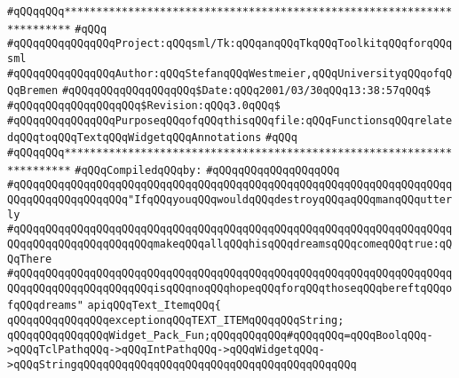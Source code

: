 \label{src/lib/tk/src/text_item.api}
\verb|#qQQqqQQq***********************************************************************|\newline
\verb|#qQQq|\newline
\verb|#qQQqqQQqqQQqqQQqProject:qQQqsml/Tk:qQQqanqQQqTkqQQqToolkitqQQqforqQQqsml|\newline
\verb|#qQQqqQQqqQQqqQQqAuthor:qQQqStefanqQQqWestmeier,qQQqUniversityqQQqofqQQqBremen|\newline
\verb|#qQQqqQQqqQQqqQQqqQQq$Date:qQQq2001/03/30qQQq13:38:57qQQq$|\newline
\verb|#qQQqqQQqqQQqqQQqqQQq$Revision:qQQq3.0qQQq$|\newline
\verb|#qQQqqQQqqQQqqQQqPurposeqQQqofqQQqthisqQQqfile:qQQqFunctionsqQQqrelatedqQQqtoqQQqTextqQQqWidgetqQQqAnnotations|\newline
\verb|#qQQq|\newline
\verb|#qQQqqQQq***********************************************************************|\newline
\newline
\verb|#qQQqCompiledqQQqby:|\newline
\verb|#qQQqqQQqqQQqqQQqqQQq|\newline
\newline
\verb|#qQQqqQQqqQQqqQQqqQQqqQQqqQQqqQQqqQQqqQQqqQQqqQQqqQQqqQQqqQQqqQQqqQQqqQQqqQQqqQQqqQQqqQQq"IfqQQqyouqQQqwouldqQQqdestroyqQQqaqQQqmanqQQqutterly|\newline
\verb|#qQQqqQQqqQQqqQQqqQQqqQQqqQQqqQQqqQQqqQQqqQQqqQQqqQQqqQQqqQQqqQQqqQQqqQQqqQQqqQQqqQQqqQQqqQQqmakeqQQqallqQQqhisqQQqdreamsqQQqcomeqQQqtrue:qQQqThere|\newline
\verb|#qQQqqQQqqQQqqQQqqQQqqQQqqQQqqQQqqQQqqQQqqQQqqQQqqQQqqQQqqQQqqQQqqQQqqQQqqQQqqQQqqQQqqQQqqQQqisqQQqnoqQQqhopeqQQqforqQQqthoseqQQqbereftqQQqofqQQqdreams"|\newline
\newline
\newline
\newline
\verb|apiqQQqText_ItemqQQq{|\newline
\newline
\verb|qQQqqQQqqQQqqQQqexceptionqQQqTEXT_ITEMqQQqqQQqString;|\newline
\newline
\verb|qQQqqQQqqQQqqQQqWidget_Pack_Fun;qQQqqQQqqQQq#qQQqqQQq=qQQqBoolqQQq->qQQqTclPathqQQq->qQQqIntPathqQQq->qQQqWidgetqQQq->qQQqStringqQQqqQQqqQQqqQQqqQQqqQQqqQQqqQQqqQQqqQQqqQQq|\newline
